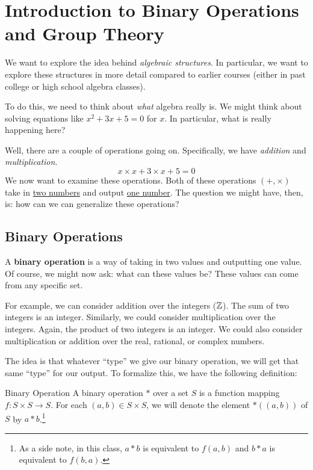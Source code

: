 \documentclass[letterpaper]{article}
\begin{document}
\newpage 
\section{Introduction to Binary Operations and Group Theory}
We want to explore the idea behind \emph{algebraic structures}. In particular, we want to explore these structures in more detail compared to earlier courses (either in past college or high school algebra classes). 

\bigskip 

To do this, we need to think about \emph{what} algebra really is. We might think about solving equations like $x^2 + 3x + 5 = 0$ for $x$. In particular, what is really happening here?

\bigskip 

Well, there are a couple of operations going on. Specifically, we have \emph{addition} and \emph{multiplication}. 
\[x \times x + 3 \times x + 5 = 0\]
We now want to examine these operations. Both of these operations $(+, \times)$ take in \underline{two numbers} and output \underline{one number}. The question we might have, then, is: how can we can generalize these operations?

\subsection{Binary Operations}
A \textbf{binary operation} is a way of taking in two values and outputting one value. Of course, we might now ask: what can these values be? These values can come from any specific set. 

\bigskip 

For example, we can consider addition over the integers ($\mathbb{Z}$). The sum of two integers is an integer. Similarly, we could consider multiplication over the integers. Again, the product of two integers is an integer. We could also consider multiplication or addition over the real, rational, or complex numbers. 

\bigskip 

The idea is that whatever ``type'' we give our binary operation, we will get that same ``type'' for our output. To formalize this, we have the following definition:  
\begin{definition}{Binary Operation}{}
    A binary operation $*$ over a set $S$ is a function mapping $f: S \times S \to S$. For each $(a, b) \in S \times S$, we will denote the element $*((a, b))$ of $S$ by $a * b$.\footnote{As a side note, in this class, $a * b$ is equivalent to $f(a, b)$ and $b * a$ is equivalent to $f(b, a)$.}
\end{definition}
\end{document}
